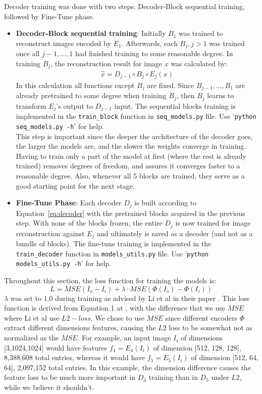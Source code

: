 Decoder training was done with two steps: Decoder-Block sequential training, followed by Fine-Tune phase.
\begin{itemize}
	\item \textbf{Decoder-Block sequential training}: Initially $B_1$ was trained to reconstruct images encoded by $E_1$. Afterwards, each $B_j, j>1$ was trained once all $j-1,\dots,1$ had finished training to some reasonable degree. In training $B_j$, the reconstruction result for image $x$ was calculated by:
	\begin{gather*}
	\hat{x} = D_{j-1} \circ B_j \circ E_j (x)
	\end{gather*}
	In this calculation all functions except $B_j$ are fixed. Since $B_{j-1}, \dots, B_1$ are already pretrained to some degree when training $B_j$, then $B_j$ learns to transform $E_j$'s output to $D_{j-1}$ input. The sequential blocks training is implemented in the \texttt{train\_block} function in \texttt{seq\_models.py} file. Use '\texttt{python seq\_models.py -h}' for help.\\
	This step is important since the deeper the architecture of the decoder goes, the larger the models are, and the slower the weights converge in training. Having to train only a part of the model at first (where the rest is already trained) removes degrees of freedom, and assures it converges faster to a reasonable degree. Also, whenever all 5 blocks are trained, they serve as a good starting point for the next stage.

	\item \textbf{Fine-Tune Phase}: Each decoder $D_j$ is built according to Equation~\ref*{eq:decoder} with the pretrained blocks acquired in the previous step. With none of the blocks frozen, the entire $D_j$ is now trained for image reconstruction against $E_j$ and ultimately is saved as a decoder (and not as a bundle of blocks). The fine-tune training is implemented in the \texttt{train\_decoder} function in \texttt{models\_utils.py} file. Use '\texttt{python models\_utils.py -h}' for help.
\end{itemize}

Throughout this section, the loss function for training the models is:
\begin{equation}\label{eq:loss}
L = MSE(I_o-I_i) + \lambda \cdot MSE(\Phi(I_o)-\Phi(I_i))
\end{equation}
$\lambda$ was set to $1.0$ during training as advised by Li et al in their paper \cite{bib11}. This loss function is derived from Equation 1 at \cite{bib11}, with the difference that we use $MSE$ where Li et al use $L2 -loss$. We chose to use $MSE$ since different encoders $\Phi$ extract different dimensions features, causing the $L2$ loss to be somewhat not as normalized as the $MSE$. For example, an input image $I_i$ of dimensions [3,1024,1024] would have features $f_4=E_4(I_i)$ of dimension [512, 128, 128], 8,388,608 total entries, whereas it would have $f_5=E_5(I_i)$ of dimension [512, 64, 64], 2,097,152 total entries. In this example, the dimension difference causes the feature loss to be much more important in $D_4$ training than in $D_5$ under $L2$, while we believe it shouldn't.\\

